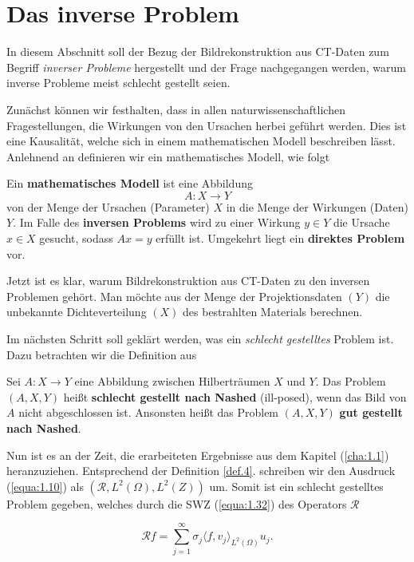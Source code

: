 \chapter*{Das inverse Problem}


In diesem Abschnitt soll der Bezug der Bildrekonstruktion aus CT-Daten zum Begriff \textit{inverser Probleme} hergestellt und der Frage nachgegangen werden, warum inverse Probleme meist schlecht gestellt seien. 

Zunächst können wir festhalten, dass in allen naturwissenschaftlichen Fragestellungen, die Wirkungen von den Ursachen herbei geführt werden. Dies ist eine Kausalität, welche sich in einem mathematischen Modell beschreiben lässt. Anlehnend an \cite[S. 14]{Rieder03} definieren wir ein mathematisches Modell, wie folgt

\begin{Definition}
	Ein \textbf{mathematisches Modell} ist eine Abbildung
	\[A: X \rightarrow Y\]
	von der Menge der Ursachen (Parameter) $X$ in die Menge der Wirkungen (Daten) $Y$. Im Falle des \textbf{inversen Problems} wird zu einer Wirkung $y \in Y$ die Ursache $x \in X$ gesucht, sodass $Ax = y$ erfüllt ist. Umgekehrt liegt ein \textbf{direktes Problem} vor.
	\label{def:3}
\end{Definition}
Jetzt ist es klar, warum Bildrekonstruktion aus CT-Daten zu den inversen Problemen gehört. Man möchte aus der Menge der Projektionsdaten $(Y)$ die unbekannte Dichteverteilung $(X)$ des bestrahlten Materials berechnen.

Im nächsten Schritt soll geklärt werden, was ein \textit{schlecht gestelltes} Problem ist. Dazu betrachten wir die Definition aus \cite[S. 24]{Rieder03}
\begin{Definition}
	Sei $A:X \rightarrow Y$ eine Abbildung zwischen Hilberträumen $X$ und $Y$. Das Problem $(A, X, Y)$ heißt \textbf{schlecht gestellt nach Nashed}\cite{Nashed} (ill-posed), wenn das Bild von $A$ nicht abgeschlossen ist. Ansonsten heißt das Problem $(A,X,Y)$ \textbf{gut gestellt nach Nashed}.	
	\label{def.4}
\end{Definition}
Nun ist es an der Zeit, die erarbeiteten Ergebnisse aus dem Kapitel (\ref{cha:1.1}) heranzuziehen. Entsprechend der Definition \ref{def.4}. schreiben wir den Ausdruck (\ref{equa:1.10}) als $(\mathcal{R}, L^2(\Omega), L^2(Z))$ um. Somit ist ein schlecht gestelltes Problem gegeben, welches durch die SWZ (\ref{equa:1.32}) des Operators $\mathcal{R}$
 
\[ \mathcal{R}f = \sum\limits_{j = 1}^{\infty} \sigma_j \langle f, v_j\rangle_{L^2(\Omega)} u_j. \]  

